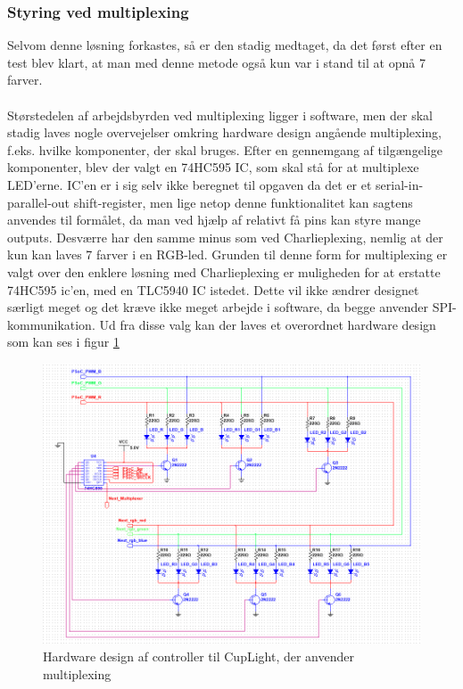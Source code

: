 \documentclass[HardwareDesign/HardwareDesign_main.tex]{subfiles}
\begin{document}
\subsubsection{Styring ved multiplexing}
Selvom denne løsning forkastes, så er den stadig medtaget, da det først efter en test blev klart, at man med denne metode også kun var i stand til at opnå 7 farver.\\\\
Størstedelen af arbejdsbyrden ved multiplexing ligger i software, men der skal stadig laves nogle overvejelser omkring hardware design angående multiplexing, f.eks. hvilke komponenter, der skal bruges. Efter en gennemgang af tilgængelige komponenter, blev der valgt en 74HC595 IC\cite{datasheet_shiftreg}, som skal stå for at multiplexe LED'erne. IC'en er i sig selv ikke beregnet til opgaven da det er et serial-in-parallel-out shift-register, men lige netop denne funktionalitet kan sagtens anvendes til formålet, da man ved hjælp af relativt få pins kan styre mange outputs. Desværre har den samme minus som ved Charlieplexing, nemlig at der kun kan laves 7 farver i en RGB-led. Grunden til denne form for multiplexing er valgt over den enklere løsning med Charlieplexing er muligheden for at erstatte 74HC595 ic'en, med en TLC5940 IC istedet. Dette vil ikke ændrer designet særligt meget og det kræve ikke meget arbejde i software, da begge anvender SPI-kommunikation. Ud fra disse valg kan der laves et overordnet hardware design som kan ses i figur \ref{fig:CupLight_HW_Multiplexing}
\begin{figure}[H]
    \centering
    \includegraphics[width=\textwidth]{HardwareDesign/CupLight/graphics/CupLight.png}
    \caption{Hardware design af controller til CupLight, der anvender multiplexing}
    \label{fig:CupLight_HW_Multiplexing}
\end{figure}
\end{document}
